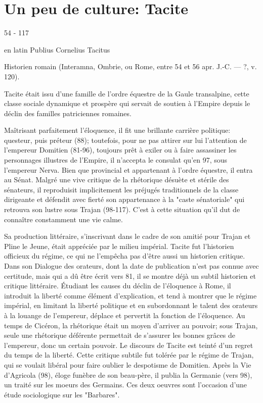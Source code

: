 \documentclass{cornouaille}
\begin{document}
\newpage
\section{Un peu de culture: Tacite}
54 - 117
 
en latin Publius Cornelius Tacitus
 
Historien romain (Interamna, Ombrie, ou Rome, entre 54 et 56 apr. J.-C. — ?, v. 120).
 
Tacite était issu d'une famille de l'ordre équestre de la Gaule transalpine, 
cette classe sociale dynamique et prospère qui servait de soutien à l'Empire depuis le déclin des familles patriciennes romaines.

 Maîtrisant parfaitement l'éloquence, 
il fit une brillante carrière politique: questeur, puis préteur (88); 
toutefois, pour ne pas attirer sur lui l'attention de l'empereur Domitien (81-96), 
toujours prêt à exiler ou à faire assassiner les personnages illustres de l'Empire, 
il n'accepta le consulat qu'en 97, sous l'empereur Nerva.
 Bien que provincial et appartenant à l'ordre équestre, 
il entra au Sénat. 
Malgré une vive critique de la rhétorique désuète et stérile des sénateurs,
 il reproduisit implicitement les préjugés traditionnels de la classe dirigeante 
et défendit avec fierté son appartenance à la "caste sénatoriale"
qui retrouva son lustre sous Trajan (98-117). 
C'est à cette situation qu'il dut de connaître constamment une vie calme.

Sa production littéraire, 
s'inscrivant dans le cadre de son amitié pour Trajan et Pline le Jeune,
 était appréciée par le milieu impérial. 
Tacite fut l'historien officieux du régime,
 ce qui ne l'empêcha pas d'être aussi un historien critique.
 Dans son Dialogue des orateurs, 
dont la date de publication n'est pas connue avec certitude,
 mais qui a dû être écrit vers 81,
 il se montre déjà un subtil historien et critique littéraire. 
Étudiant les causes du déclin de l'éloquence à Rome, 
il introduit la liberté comme élément d'explication, 
et tend à montrer que le régime impérial, 
en limitant la liberté politique 
et en subordonnant le talent des orateurs à la louange de l'empereur,
 déplace et pervertit la fonction de l'éloquence.
 Au temps de Cicéron, la rhétorique était un moyen d'arriver au pouvoir;
 sous Trajan, seule une rhétorique déférente permettait 
de s'assurer les bonnes grâces de l'empereur,
 donc un certain pouvoir.
 Le discours de Tacite est teinté d'un regret du temps de la liberté.
 Cette critique subtile fut tolérée par le régime de Trajan,
 qui se voulait libéral pour faire oublier le despotisme de Domitien.
Après la Vie d'Agricola (98), 
éloge funèbre de son beau-père,
 il publia la Germanie (vers 98),
 un traité sur les moeurs des Germains. 
Ces deux oeuvres sont l'occasion d'une étude sociologique sur les "Barbares".
\end{document}
